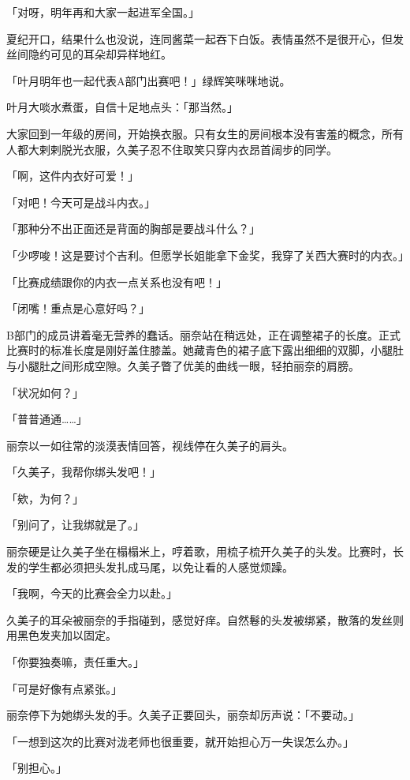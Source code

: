 \documentclass[UTF8]{ctexart}
\begin{document}
    「对呀，明年再和大家一起进军全国。」 

    夏纪开口，结果什么也没说，连同酱菜一起吞下白饭。表情虽然不是很开心，但发丝间隐约可见的耳朵却异样地红。 

    「叶月明年也一起代表A部门出赛吧！」绿辉笑咪咪地说。 

    叶月大啖水煮蛋，自信十足地点头：「那当然。」 

    大家回到一年级的房间，开始换衣服。只有女生的房间根本没有害羞的概念，所有人都大剌剌脱光衣服，久美子忍不住取笑只穿内衣昂首阔步的同学。 

    「啊，这件内衣好可爱！」 

    「对吧！今天可是战斗内衣。」 

    「那种分不出正面还是背面的胸部是要战斗什么？」 

    「少啰唆！这是要讨个吉利。但愿学长姐能拿下金奖，我穿了关西大赛时的内衣。」 

    「比赛成绩跟你的内衣一点关系也没有吧！」 

    「闭嘴！重点是心意好吗？」 

    B部门的成员讲着毫无营养的蠢话。丽奈站在稍远处，正在调整裙子的长度。正式比赛时的标准长度是刚好盖住膝盖。她藏青色的裙子底下露出细细的双脚，小腿肚与小腿肚之间形成空隙。久美子瞥了优美的曲线一眼，轻拍丽奈的肩膀。 

    「状况如何？」 

    「普普通通……」 

    丽奈以一如往常的淡漠表情回答，视线停在久美子的肩头。 

    「久美子，我帮你绑头发吧！」 

    「欸，为何？」 

    「别问了，让我绑就是了。」 

    丽奈硬是让久美子坐在榻榻米上，哼着歌，用梳子梳开久美子的头发。比赛时，长发的学生都必须把头发扎成马尾，以免让看的人感觉烦躁。 

    「我啊，今天的比赛会全力以赴。」 

    久美子的耳朵被丽奈的手指碰到，感觉好痒。自然鬈的头发被绑紧，散落的发丝则用黑色发夹加以固定。 

    「你要独奏嘛，责任重大。」 

    「可是好像有点紧张。」 

    丽奈停下为她绑头发的手。久美子正要回头，丽奈却厉声说：「不要动。」 

    「一想到这次的比赛对泷老师也很重要，就开始担心万一失误怎么办。」 

    「别担心。」 
\end{document}
